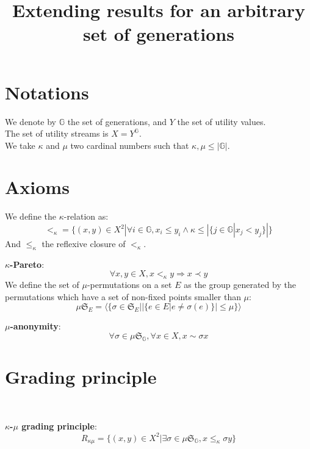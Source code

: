 \documentclass{article}
\title{Extending results for an arbitrary set of generations}
\author{}
\newcommand{\G}{\mathbb{G}}
\begin{document}
\maketitle

\section{Notations}

We denote by $\G$ the set of generations, and $Y$ the set of utility values.\\
The set of utility streams is $X=Y^\G$.\\
We take $\kappa$ and $\mu$ two cardinal numbers such that $\kappa,\mu\leq|\G|$.

\section{Axioms}

We define the $\kappa$-relation as:
\[<_\kappa = \{(x,y)\in X^2|\forall i\in \G, x_i \leq y_i \land \kappa \leq
|\{j \in \G | x_j < y_j\}|\}\]
And $\leq_\kappa$ the reflexive closure of $<_\kappa$.\smallskip\par

\textbf{$\kappa$-Pareto}:
\[\forall x,y\in X, x <_\kappa y \Rightarrow x \prec y\]
We define the set of $\mu$-permutations on a set $E$ as the group generated by the permutations
which have a set of non-fixed points smaller than $\mu$:
\[\mu\mathfrak{S}_E = \langle\{\sigma\in\mathfrak{S}_E | |\{e\in E
|e\neq \sigma(e)\}|\leq \mu\}\rangle\]

\textbf{$\mu$-anonymity}:
\[\forall\sigma\in\mu\mathfrak{S}_\G,\forall x\in X, x \sim \sigma x\]

\section{Grading principle}
\ \par
\textbf{$\kappa$-$\mu$ grading principle}:
\[R_{\kappa\mu} = \{(x,y)\in X^2 | \exists\sigma\in\mu\mathfrak{S}_\G, x \leq_\kappa \sigma y\}\]
\end{document}
